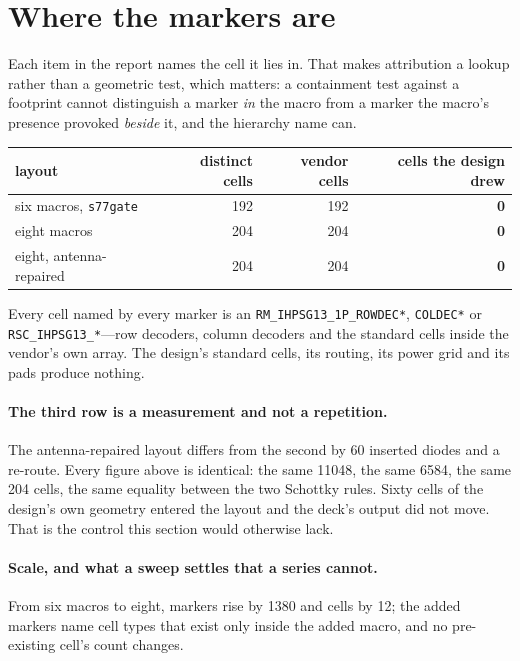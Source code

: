 \documentclass[11pt,a4paper]{article}
\newcommand{\file}[1]{\texttt{\small #1}}
\begin{document}
\section{Where the markers are}
\label{sec:attribution}

Each item in the report names the cell it lies in. That makes
attribution a lookup rather than a geometric test, which matters: a
containment test against a footprint cannot distinguish a marker
\emph{in} the macro from a marker the macro's presence provoked
\emph{beside} it, and the hierarchy name can.

\begin{center}
\begin{tabular}{lrrr}
\toprule
layout & distinct cells & vendor cells & \textbf{cells the design drew} \\
\midrule
six macros, \file{s77gate}   & \num{192} & \num{192} & \textbf{0} \\
eight macros                 & \num{204} & \num{204} & \textbf{0} \\
eight, antenna-repaired      & \num{204} & \num{204} & \textbf{0} \\
\bottomrule
\end{tabular}
\end{center}

Every cell named by every marker is an \texttt{RM\_IHPSG13\_1P\_ROWDEC*},
\texttt{COLDEC*} or \texttt{RSC\_IHPSG13\_*}---row decoders, column
decoders and the standard cells inside the vendor's own array. The
design's standard cells, its routing, its power grid and its pads
produce nothing.

\paragraph{The third row is a measurement and not a repetition.} The
antenna-repaired layout differs from the second by \num{60} inserted
diodes and a re-route. Every figure above is identical: the same
\num{11048}, the same \num{6584}, the same \num{204} cells, the same
equality between the two Schottky rules. Sixty cells of the design's own
geometry entered the layout and the deck's output did not move. That is
the control this section would otherwise lack.

\paragraph{Scale, and what a sweep settles that a series cannot.} From
six macros to eight, markers rise by \num{1380} and cells by \num{12};
the added markers name cell types that exist only inside the added
macro, and no pre-existing cell's count changes.
\end{document}

